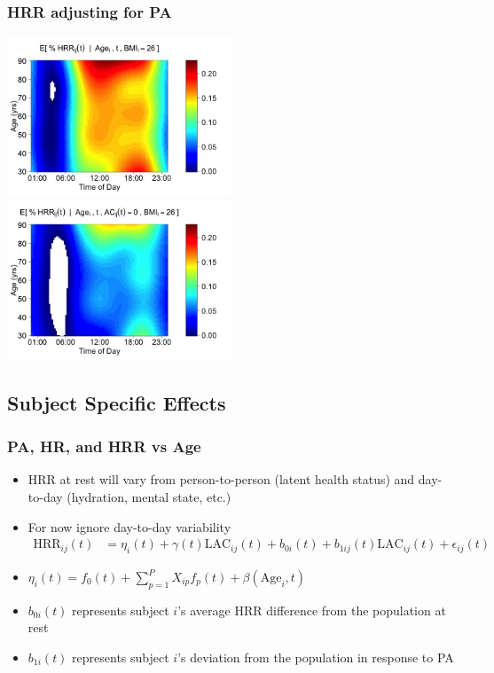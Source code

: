 \documentclass[10pt]{beamer}\usepackage[]{graphicx}\usepackage[]{color}
\begin{document}
\begin{frame}
\frametitle{HRR adjusting for PA}
\begin{center}
\includegraphics[width=0.5\textwidth]{coef_HRR_mar.jpeg}
\includegraphics[width=0.5\textwidth]{coef_HRR_lAC0.jpeg}
\end{center}
\end{frame}






\subsection{Subject Specific Effects}

\begin{frame}
\frametitle{PA, HR, and HRR vs Age}
\begin{itemize}
\item HRR at rest will vary from person-to-person (latent health status) and day-to-day (hydration, mental state, etc.) 
\item For now ignore day-to-day variability \pause
\begin{align*}
\text{HRR}_{ij}(t) &= \eta_{i}(t) + \gamma(t)\text{LAC}_{ij}(t) + b_{0i}(t) +  b_{1ij}(t)\text{LAC}_{ij}(t) + \epsilon_{ij}(t)
\end{align*}
\item $\eta_{i}(t) = f_0(t) + \sum_{p=1}^P X_{ip}f_p(t) + \beta(\text{Age}_i,t) $
\item $b_{0i}(t)$ represents subject $i$'s average HRR difference from the population at rest
\item {\color{red}$b_{1i}(t)$} represents subject $i$'s deviation from the population in response to PA
\end{itemize}
\end{frame}
\end{document}

